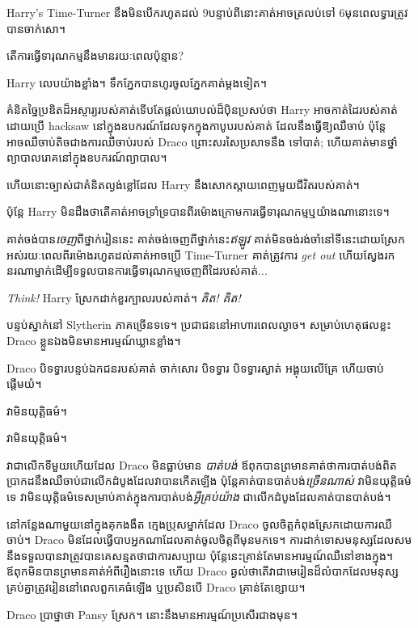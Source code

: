 {{{{{{Harry's Time-Turner នឹងមិនបើករហូតដល់ 9\pm បន្ទាប់ពីនោះគាត់អាចត្រលប់ទៅ 6\pm មុនពេលទ្វារត្រូវបានចាក់សោ។

តើការធ្វើទារុណកម្មនឹងមានរយៈពេលប៉ុន្មាន?

Harry លេប​យ៉ាង​ខ្លាំង។ ទឹកភ្នែកបានហូរចូលភ្នែកគាត់ម្តងទៀត។

គំនិតច្នៃប្រឌិតដ៏អស្ចារ្យរបស់គាត់ទើបតែផ្តល់យោបល់ដ៏ប៉ិនប្រសប់ថា Harry អាចកាត់ដៃរបស់គាត់ដោយប្រើ hacksaw នៅក្នុងឧបករណ៍ដែលទុកក្នុងកាបូបរបស់គាត់ ដែលនឹងធ្វើឱ្យឈឺចាប់ ប៉ុន្តែអាចឈឺចាប់តិចជាងការឈឺចាប់របស់ Draco ព្រោះសរសៃប្រសាទនឹង ទៅបាត់; ហើយគាត់មានថ្នាំព្យាបាលរោគនៅក្នុងឧបករណ៍ព្យាបាល។

ហើយនោះច្បាស់ជាគំនិតល្ងង់ខ្លៅដែល Harry នឹងសោកស្តាយពេញមួយជីវិតរបស់គាត់។

ប៉ុន្តែ Harry មិន​ដឹង​ថា​តើ​គាត់​អាច​ទ្រាំទ្រ​បាន​ពីរ​ម៉ោង​ក្រោម​ការ​ធ្វើ​ទារុណកម្ម​ឬ​យ៉ាង​ណា​នោះ​ទេ។

គាត់ចង់បាន\emph{ចេញ}ពីថ្នាក់រៀននេះ គាត់ចង់ចេញពីថ្នាក់នេះ\emph{ឥឡូវ} គាត់មិនចង់រង់ចាំនៅទីនេះដោយស្រែកអស់រយៈពេលពីរម៉ោងរហូតដល់គាត់អាចប្រើ Time-Turner គាត់ត្រូវការ \emph{get out} ហើយស្វែងរកនរណាម្នាក់ដើម្បីទទួលបានការធ្វើទារុណកម្មចេញពីដៃរបស់គាត់...

\emph{Think!} Harry ស្រែកដាក់ខួរក្បាលរបស់គាត់។ \emph{គិត! គិត!}

\later

បន្ទប់ស្នាក់នៅ Slytherin ភាគច្រើនទទេ។ ប្រជាជននៅអាហារពេលល្ងាច។ សម្រាប់ហេតុផលខ្លះ Draco ខ្លួនឯងមិនមានអារម្មណ៍ឃ្លានខ្លាំង។

Draco បិទទ្វារបន្ទប់ឯកជនរបស់គាត់ ចាក់សោរ បិទទ្វារ បិទទ្វារស្ងាត់ អង្គុយលើគ្រែ ហើយចាប់ផ្តើមយំ។

វា​មិន​យុត្តិធម៌។

វា​មិន​យុត្តិធម៌។

វាជាលើកទីមួយហើយដែល Draco មិនធ្លាប់មាន \emph{បាត់បង់} ឪពុកបានព្រមានគាត់ថាការបាត់បង់ពិតប្រាកដនឹងឈឺចាប់ជាលើកដំបូងដែលវាបានកើតឡើង ប៉ុន្តែគាត់បានបាត់បង់\emph{ច្រើនណាស់} វាមិនយុត្តិធម៌ទេ វាមិនយុត្តិធម៌ទេសម្រាប់គាត់ក្នុងការបាត់បង់\emph{អ្វីគ្រប់យ៉ាង} ជាលើកដំបូងដែលគាត់បានបាត់បង់។

នៅកន្លែងណាមួយនៅក្នុងគុកងងឹត ក្មេងប្រុសម្នាក់ដែល Draco ចូលចិត្តកំពុងស្រែកដោយការឈឺចាប់។ Draco មិន​ដែល​ធ្វើ​បាប​អ្នក​ណា​ដែល​គាត់​ចូល​ចិត្ត​ពី​មុន​មក​ទេ។ ការ​ដាក់​ទោស​មនុស្ស​ដែល​សម​នឹង​ទទួល​បាន​វា​ត្រូវ​បាន​គេ​សន្មត​ថា​ជា​ការ​សប្បាយ ប៉ុន្តែ​នេះ​គ្រាន់​តែ​មាន​អារម្មណ៍​ឈឺ​នៅ​ខាង​ក្នុង​។ ឪពុកមិនបានព្រមានគាត់អំពីរឿងនោះទេ ហើយ Draco ឆ្ងល់ថាតើវាជាមេរៀនដ៏លំបាកដែលមនុស្សគ្រប់គ្នាត្រូវរៀននៅពេលពួកគេធំឡើង ឬប្រសិនបើ Draco គ្រាន់តែខ្សោយ។

Draco ប្រាថ្នាថា Pansy ស្រែក។ នោះនឹងមានអារម្មណ៍ប្រសើរជាងមុន។

}}}}}}
